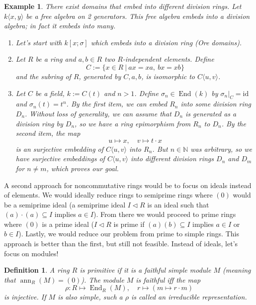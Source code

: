 \documentclass[10pt, a4paper]{article}
\newtheorem{defi}[thm]{Definition}
\newenvironment{noticeB}{%
  \tcolorbox[%
  notitle,
  empty,
  enhanced,  %
  breakable,
  coltext=black,
  colback=white, 
  fontupper=\rmfamily,
  noparskip,
  sharp corners,
  boxrule=-1pt,  %
  frame hidden,
  left=7pt,  %
  right=7pt,
  top=5pt,
  bottom=5pt,
  before skip=2.5ex plus 2pt,
  after skip=2.5ex plus 2pt,
  borderline west = {1.5pt}{-0.1pt}{blue!30!black}, %
  overlay unbroken and last={%
    \draw[color=black, line width=1.25pt]
    ($(frame.south west)+(1.pt, -0.1pt)$) -- ++(2em, 0);
  }
  ]}
{\endtcolorbox}
\newenvironment{definition}{\begin{noticeB}\begin{defi}}{%
    \end{defi}\end{noticeB}}
\newtheorem{example}[thm]{Example}
\newcommand{\N}{\mathbb {N}}
\DeclareMathOperator{\en}{End}
\DeclareMathOperator{\ann}{ann}
\begin{document}
\begin{example}
  There exist domains that embed into different division rings.
  Let $k\langle x, y\rangle$ be a free algebra on 2 generators.
  This free algebra embeds into a division algebra; in fact it embeds into many.
  \begin{enumerate}
    \item Let's start with $k [x; \sigma]$ which embeds into a division ring (Ore domains).
    \item Let $R$ be a ring and $a, b \in R$ two $R$-independent elements. Define 
    $$C := \{x \in R\ |\ ax = xa,\ bx = xb\}$$
    and the subring of $R$, generated by $C, a, b$, is isomorphic to $C\langle u, v \rangle$.
    \item Let $C$ be a field, $k := C(t)$ and $n > 1$. Define $\sigma_n \in \en (k)$ by $\sigma_n \big|_C = \mathrm{id}$
    and $\sigma_n (t) = t^n$. By the first item, we can embed $R_n$ into some division ring $D_n$.
    Without loss of generality, we can assume that $D_n$ is generated as a division ring by $D_n$, so we have a ring epimorphism from $R_n$ to $D_n$.
    By the second item, the map $$u \mapsto x,\quad v \mapsto t \cdot x$$ is an surjective embedding of $C\langle u, v\rangle$ into $R_n$. 
    But $n \in \N$ was arbitrary, so we have surjective embeddings of $C\langle u, v \rangle$
    into different division rings $D_n$ and $D_m$ for $n \neq m$, which proves our goal.
  \end{enumerate}
\end{example}

A second approach for noncommutative rings would be to focus on ideals instead of elements.
We would ideally reduce rings to semiprime rings where $(0)$ would be a semiprime ideal (a semiprime ideal $I \lhd R$ is an ideal 
such that $(a) \cdot (a) \subseteq I$ implies $a \in I$).
From there we would proceed to prime rings where $(0)$ is a prime ideal ($I \lhd R$ is prime if $(a) (b) \subseteq I$ implies $a \in I$ or $b \in I$).
Lastly, we would reduce our problem from prime to simple rings. This approach is better than the first, but still not feasible.
Instead of ideals, let's focus on modules!

\begin{definition}
  A ring $R$ is primitive if it is a faithful simple module $M$ (meaning that $\ann_R (M) = (0)$).
  The module $M$ is faithful iff the map
  $$\rho: R \mapsto \en_R (M),\quad r \mapsto (m \mapsto r \cdot m)$$
  is injective. If $M$ is also simple, such a $\rho$ is called an irreducible representation.
\end{definition}
\end{document}
